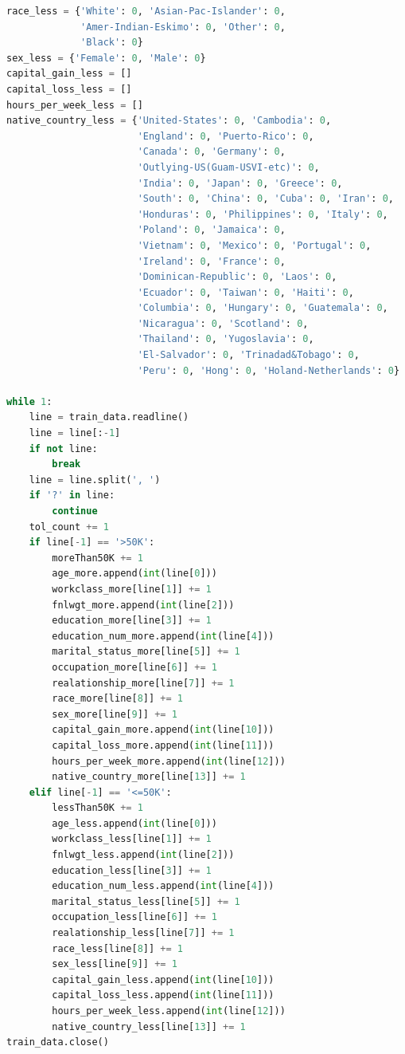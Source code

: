 ﻿\documentclass[a4paper, 11pt]{article}
\begin{document}
\begin{lstlisting}[language=Python,frame=single]
race_less = {'White': 0, 'Asian-Pac-Islander': 0,
             'Amer-Indian-Eskimo': 0, 'Other': 0,
             'Black': 0}
sex_less = {'Female': 0, 'Male': 0}
capital_gain_less = []
capital_loss_less = []
hours_per_week_less = []
native_country_less = {'United-States': 0, 'Cambodia': 0,
                       'England': 0, 'Puerto-Rico': 0,
                       'Canada': 0, 'Germany': 0,
                       'Outlying-US(Guam-USVI-etc)': 0,
                       'India': 0, 'Japan': 0, 'Greece': 0,
                       'South': 0, 'China': 0, 'Cuba': 0, 'Iran': 0,
                       'Honduras': 0, 'Philippines': 0, 'Italy': 0,
                       'Poland': 0, 'Jamaica': 0,
                       'Vietnam': 0, 'Mexico': 0, 'Portugal': 0,
                       'Ireland': 0, 'France': 0,
                       'Dominican-Republic': 0, 'Laos': 0,
                       'Ecuador': 0, 'Taiwan': 0, 'Haiti': 0,
                       'Columbia': 0, 'Hungary': 0, 'Guatemala': 0,
                       'Nicaragua': 0, 'Scotland': 0,
                       'Thailand': 0, 'Yugoslavia': 0,
                       'El-Salvador': 0, 'Trinadad&Tobago': 0,
                       'Peru': 0, 'Hong': 0, 'Holand-Netherlands': 0}

while 1:
    line = train_data.readline()
    line = line[:-1]
    if not line:
        break
    line = line.split(', ')
    if '?' in line:
        continue
    tol_count += 1
    if line[-1] == '>50K':
        moreThan50K += 1
        age_more.append(int(line[0]))
        workclass_more[line[1]] += 1
        fnlwgt_more.append(int(line[2]))
        education_more[line[3]] += 1
        education_num_more.append(int(line[4]))
        marital_status_more[line[5]] += 1
        occupation_more[line[6]] += 1
        realationship_more[line[7]] += 1
        race_more[line[8]] += 1
        sex_more[line[9]] += 1
        capital_gain_more.append(int(line[10]))
        capital_loss_more.append(int(line[11]))
        hours_per_week_more.append(int(line[12]))
        native_country_more[line[13]] += 1
    elif line[-1] == '<=50K':
        lessThan50K += 1
        age_less.append(int(line[0]))
        workclass_less[line[1]] += 1
        fnlwgt_less.append(int(line[2]))
        education_less[line[3]] += 1
        education_num_less.append(int(line[4]))
        marital_status_less[line[5]] += 1
        occupation_less[line[6]] += 1
        realationship_less[line[7]] += 1
        race_less[line[8]] += 1
        sex_less[line[9]] += 1
        capital_gain_less.append(int(line[10]))
        capital_loss_less.append(int(line[11]))
        hours_per_week_less.append(int(line[12]))
        native_country_less[line[13]] += 1
train_data.close()


\end{lstlisting}
\end{document}
